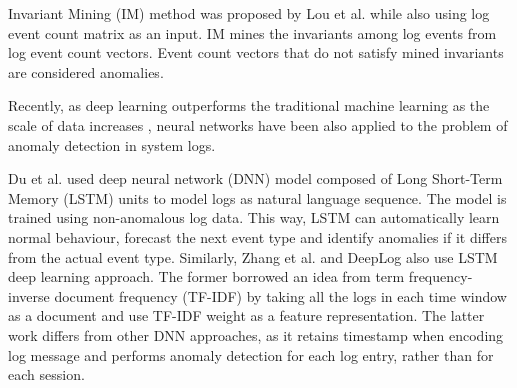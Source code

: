 Invariant Mining (IM) method was proposed by Lou et al. \cite{lou2010} while also using log event count matrix as an input. IM mines the invariants among log events from log event count vectors. Event count vectors that do not satisfy mined invariants are considered anomalies. 

Recently, as deep learning outperforms the traditional machine learning as the scale of data increases \cite{Sydney2019DeepLF}, neural networks have been also applied to the problem of anomaly detection in system logs. 

Du et al. \cite{duLSTM2017} used deep neural network (DNN) model composed of Long Short-Term Memory (LSTM) units to model logs as natural language sequence. The model is trained using non-anomalous log data. This way, LSTM can automatically learn normal behaviour, forecast the next event type and identify anomalies if it differs from the actual event type. Similarly, Zhang et al. \cite{zhang2016} and DeepLog \cite{deeplog2017} also use LSTM deep learning approach. The former borrowed an idea from term frequency-inverse document frequency (TF-IDF) by taking all the logs in each time window as a document and use TF-IDF weight as a feature representation. The latter work differs from other DNN approaches, as it retains timestamp when encoding log message and performs anomaly detection for each log entry, rather than for each session.
